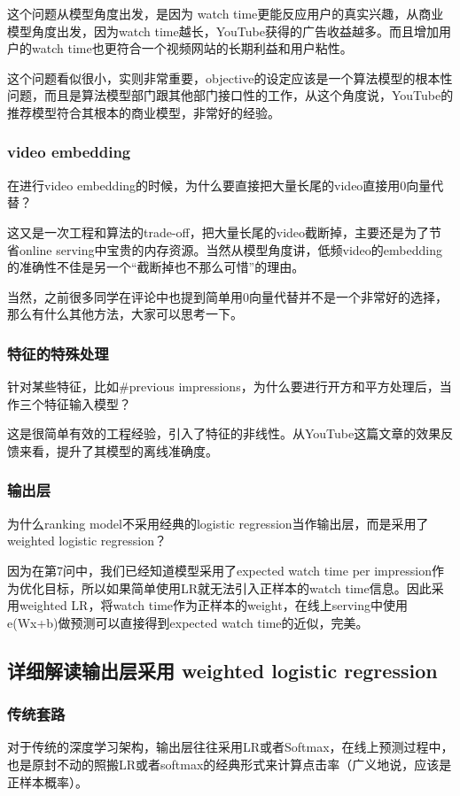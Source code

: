 \documentclass[12pt]{article}
\begin{document}
这个问题从模型角度出发，是因为 watch time更能反应用户的真实兴趣，从商业模型角度出发，因为watch time越长，YouTube获得的广告收益越多。而且增加用户的watch time也更符合一个视频网站的长期利益和用户粘性。

这个问题看似很小，实则非常重要，objective的设定应该是一个算法模型的根本性问题，而且是算法模型部门跟其他部门接口性的工作，从这个角度说，YouTube的推荐模型符合其根本的商业模型，非常好的经验。

\subsubsection{video embedding}
在进行video embedding的时候，为什么要直接把大量长尾的video直接用0向量代替？

这又是一次工程和算法的trade-off，把大量长尾的video截断掉，主要还是为了节省online serving中宝贵的内存资源。当然从模型角度讲，低频video的embedding的准确性不佳是另一个“截断掉也不那么可惜”的理由。

当然，之前很多同学在评论中也提到简单用0向量代替并不是一个非常好的选择，那么有什么其他方法，大家可以思考一下。

\subsubsection{特征的特殊处理}
针对某些特征，比如\#previous impressions，为什么要进行开方和平方处理后，当作三个特征输入模型？

这是很简单有效的工程经验，引入了特征的非线性。从YouTube这篇文章的效果反馈来看，提升了其模型的离线准确度。

\subsubsection{输出层}
为什么ranking model不采用经典的logistic regression当作输出层，而是采用了weighted logistic regression？

因为在第7问中，我们已经知道模型采用了expected watch time per impression作为优化目标，所以如果简单使用LR就无法引入正样本的watch time信息。因此采用weighted LR，将watch time作为正样本的weight，在线上serving中使用e(Wx+b)做预测可以直接得到expected watch time的近似，完美。

\subsection{详细解读输出层采用 weighted logistic regression}
\subsubsection{传统套路}
对于传统的深度学习架构，输出层往往采用LR或者Softmax，在线上预测过程中，也是原封不动的照搬LR或者softmax的经典形式来计算点击率（广义地说，应该是正样本概率）。
\end{document}
